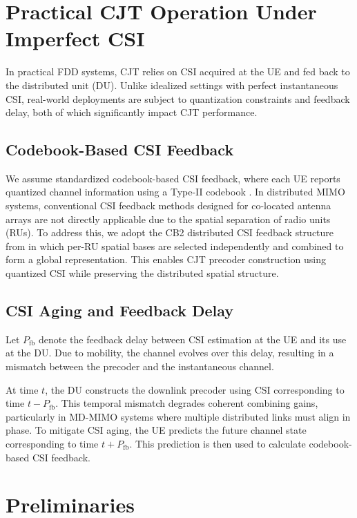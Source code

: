 \documentclass[lettersize,journal]{IEEEtran}
\begin{document}
\section{Practical CJT Operation Under Imperfect CSI}
\label{sec:practical_op}

In practical FDD systems, CJT relies on CSI acquired at the UE and fed back to the distributed unit (DU). Unlike idealized settings with perfect instantaneous CSI, real-world deployments are subject to quantization constraints and feedback delay, both of which significantly impact CJT performance.

\subsection{Codebook-Based CSI Feedback}

We assume standardized codebook-based CSI feedback, where each UE reports quantized channel information using a Type-II codebook \cite{codebook_tut}.
In distributed MIMO systems, conventional CSI feedback methods designed for co-located antenna arrays are not directly applicable due to the spatial separation of radio units (RUs).
To address this, we adopt the CB2 distributed CSI feedback structure from \cite{dmimo_csi_fb} in which per-RU spatial bases are selected independently and combined to form a global representation.
This enables CJT precoder construction using quantized CSI while preserving the distributed spatial structure.

\subsection{CSI Aging and Feedback Delay}

Let $P_{\mathrm{fb}}$ denote the feedback delay between CSI estimation at the UE and its use at the DU. Due to mobility, the channel evolves over this delay, resulting in a mismatch between the precoder and the instantaneous channel.

At time $t$, the DU constructs the downlink precoder using CSI corresponding to time $t - P_{\mathrm{fb}}$. This temporal mismatch degrades coherent combining gains, particularly in MD-MIMO systems where multiple distributed links must align in phase.
To mitigate CSI aging, the UE predicts the future channel state corresponding to time $t + P_{\mathrm{fb}}$. 
This prediction is then used to calculate codebook-based CSI feedback.

\section{Preliminaries}
\end{document}
